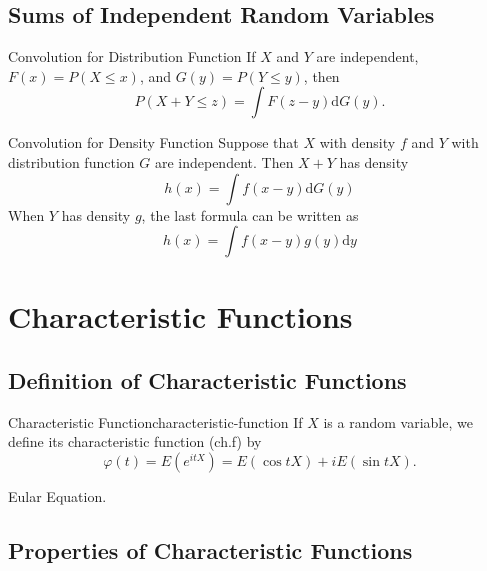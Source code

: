 \subsection{Sums of Independent Random Variables}

\begin{theorem}{Convolution for Distribution Function}{}
    If $X$ and $Y$ are independent, $F(x)=P(X\leq x)$, and $G(y)=P(Y\leq y)$, then
    \begin{equation}
        P(X+Y\leq z)=\int F(z-y)\mathrm{d}G(y).
    \end{equation}
\end{theorem}

\begin{theorem}{Convolution for Density Function}{}
    Suppose that $X$ with density $f$ and $Y$ with distribution function $G$ are independent. Then $X+Y$ has density
    \begin{equation}
        h(x)=\int f(x-y)\mathrm{d}G(y)
    \end{equation}
    When $Y$ has density $g$, the last formula can be written as
    \begin{equation}
        h(x)=\int f(x-y)g(y)\mathrm{d}y
    \end{equation}
\end{theorem}

\section{Characteristic Functions}

\subsection{Definition of Characteristic Functions}

\begin{definition}{Characteristic Function}{characteristic-function}
    If $X$ is a random variable, we define its characteristic function (ch.f) by
    \begin{equation}
        \varphi(t)=E\left(e^{itX}\right)=E\left(\cos tX\right)+i E\left(\sin tX\right).
    \end{equation}
\end{definition}

\begin{note}
    Eular Equation.
\end{note}

\subsection{Properties of Characteristic Functions}

